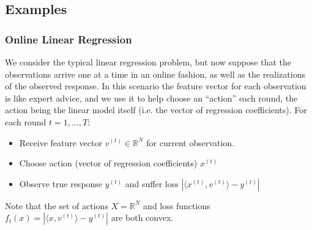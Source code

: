 \documentclass[12pt]{article}
\newcommand*{\abs}[1]{\left\lvert#1\right\rvert}
\newcommand{\R}{\mathcal{R}}
\def\R{\mathbb{R}}
\begin{document}
\subsection{Examples}

\subsubsection{Online Linear Regression}
We consider the typical linear regression problem, but now suppose that the observations arrive one at a time in an online fashion, as well as the realizations of the observed response. 
In this scenario the feature vector for each observation is like expert advice, and we use it to help choose an ``action'' each round, the action being the linear model itself (i.e. the vector 
of regression coefficients). 
For each round $t = 1, \dots, T$:
\begin{itemize}
\item Receive feature vector $v^{(t)} \in \R^N$ for current observation.
\item Choose action (vector of regression coefficients) $x^{(t)}$
\item Observe true response $y^{(t)}$ and suffer loss $\abs{\langle x^{(t)}, v^{(t)} \rangle - y^{(t)}}$
\end{itemize}
Note that the set of actions $X = \R^N$ and loss functions $f_t(x) = \abs{\langle x, v^{(t)} \rangle - y^{(t)}}$ are both convex. 
\end{document}

